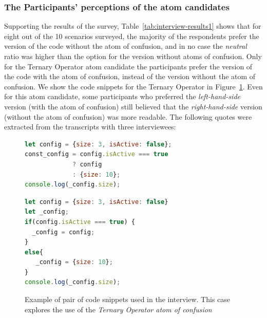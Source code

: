 \subsubsection*{The Participants' perceptions of the atom candidates}
Supporting the results of the survey, Table~\ref{tab:interview-results1}
 shows that for eight out of the
10 scenarios surveyed, the majority of the respondents prefer the version of the
code without the atom of confusion, and in no case the \emph{neutral}
ratio was higher than the option for the version without atoms of confusion.
Only for the Ternary Operator atom candidate the participants
prefer the version of the code with the atom of confusion,
instead of the version without the atom of confusion.
We show the code snippets for the Ternary Operator in Figure~\ref{code:ternary}.
Even for this atom candidate, some participants who preferred 
the \emph{left-hand-side} version (with the atom of confusion) 
still believed that the \emph{right-hand-side} version (without the atom of
confusion) was more readable.  
The following quotes were extracted from the transcripts with
three interviewees:

\begin{figure}

\noindent\begin{minipage}{.45\textwidth}
\begin{lstlisting}[language=JavaScript, caption=\emph{Left-hand side} (using the \emph{Ternary Operator} atom)]
let config = {size: 3, isActive: false};
const_config = config.isActive === true 
             ? config 
             : {size: 10};
console.log(_config.size);
\end{lstlisting}
\end{minipage}\hfill
\begin{minipage}{.45\textwidth}
\begin{lstlisting}[language=JavaScript, caption=\emph{Right-hand side} (without the atom)]
let config = {size: 3, isActive: false}
let _config;
if(config.isActive === true) {
  _config = config;
}
else{
   _config = {size: 10};
}
console.log(_config.size);
\end{lstlisting}
\end{minipage}
\caption{Example of pair of code snippets used in the interview. This case explores the use of the \emph{Ternary Operator atom of confusion}}
\label{code:ternary}
\end{figure}

